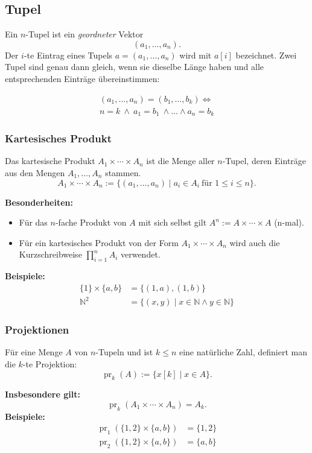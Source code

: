 \subsection{Tupel}
Ein \(n\)-Tupel ist ein \emph{geordneter} Vektor
\[
  (a_1,\dots,a_n).
\]
Der \(i\)-te Eintrag eines Tupels \(a=(a_1,\dots,a_n)\) wird mit \(a[i]\) bezeichnet.
Zwei Tupel sind genau dann gleich, wenn sie dieselbe Länge haben und alle entsprechenden Einträge übereinstimmen:

\begin{multline*}
  (a_1,\dots,a_n)=(b_1,\dots,b_k) \iff \\
  n=k\ \land\ a_1=b_1\ \land \dots \land a_n=b_k
\end{multline*}

\subsubsection{Kartesisches Produkt}
Das kartesische Produkt \(A_1\times\cdots\times A_n\) ist die Menge aller \(n\)-Tupel, deren Einträge aus den Mengen \(A_1,\dots,A_n\) stammen.
\[
  A_1\times\cdots\times A_n:=\{(a_1,\dots,a_n)\mid a_i\in A_i\ \text{für }1\le i\le n\}.
\]

\textbf{Besonderheiten:}
\begin{itemize}
  \item Für das $n$-fache Produkt von \(A\) mit sich selbst gilt \(A^n:=A\times\cdots\times A\) (n-mal).
  \item Für ein kartesisches Produkt von der Form \(A_1\times\cdots\times A_n\) wird auch die Kurzschreibweise \(\prod_{i=1}^n A_i\) verwendet.
\end{itemize}

\textbf{Beispiele:}
\begin{align*}
  \{1\} \times \{a, b\} &= \{(1, a), (1, b)\} \\
  \mathbb{N}^2 &= \{(x, y) \mid x \in \mathbb{N} \land y \in \mathbb{N}\}
\end{align*}

\subsubsection{Projektionen}
Für eine Menge \(A\) von \(n\)-Tupeln und ist \(k \le n\) eine natürliche Zahl, definiert man die \(k\)-te Projektion:
\[
  \operatorname{pr}_k(A) := \{ x[k] \mid x \in A \}.
\]

\textbf{Insbesondere gilt:}
\[
  \operatorname{pr}_k(A_1 \times \cdots \times A_n) = A_k.
\]
\textbf{Beispiele:}
\begin{align*}
  \operatorname{pr}_1(\{1,2\} \times \{a,b\}) &= \{1, 2\} \\
  \operatorname{pr}_2(\{1,2\} \times \{a,b\}) &= \{a, b\}
\end{align*}